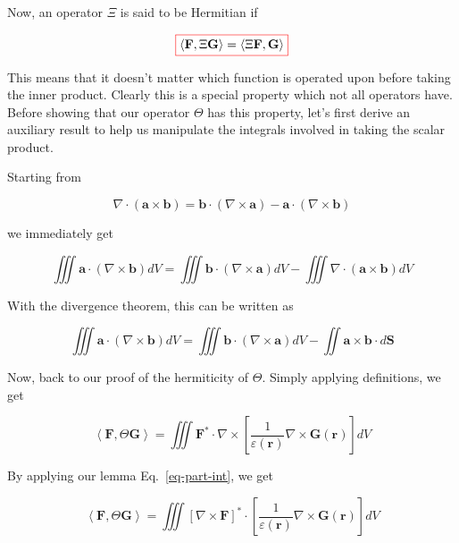Now, an operator $\Xi$ is said to be Hermitian if

\begin{equation}
\fbox{$\displaystyle
\left\langle {\mathbf F}, \Xi {\mathbf G}\right\rangle = \left\langle \Xi {\mathbf F}, {\mathbf G}\right\rangle
$}
\end{equation} 

This means that it doesn't matter which function is operated upon before taking the inner product. Clearly this is a special property which not all operators have. Before showing that our operator $\Theta$ has this property, let's first derive an auxiliary result to help us manipulate the integrals involved in taking the scalar product. 

Starting from

\begin{equation}
\nabla \cdot ({\mathbf a} \times {\mathbf b}) = {\mathbf b} \cdot ( \nabla \times {\mathbf a}) - {\mathbf a}  \cdot (\nabla \times {\mathbf b})
\end{equation} 

we immediately get

\begin{equation}
\iiint {\mathbf a}  \cdot (\nabla \times {\mathbf b}) dV = \iiint {\mathbf b} \cdot ( \nabla \times {\mathbf a}) dV - \iiint \nabla \cdot ({\mathbf a} \times {\mathbf b}) dV 
\end{equation} 

With the divergence theorem, this can be written as

\begin{equation}
\iiint {\mathbf a}  \cdot (\nabla \times {\mathbf b}) dV = \iiint {\mathbf b} \cdot ( \nabla \times {\mathbf a}) dV - \iint  {\mathbf a} \times {\mathbf b} \cdot d{\mathbf S} \label{eq-part-int}
\end{equation} 

Now, back to our proof of the hermiticity of $\Theta$. Simply applying definitions, we get

\begin{equation}
\left\langle {\mathbf F}, \Theta {\mathbf G}\right\rangle = \iiint {\mathbf F}^* \cdot\nabla \times \left[ \frac{1}{\varepsilon({\mathbf r})}\nabla \times {\mathbf G({\mathbf r})}  \right ] dV 
\end{equation} 

By applying our lemma Eq.~\ref{eq-part-int}, we get

\begin{equation}
\left\langle {\mathbf F}, \Theta {\mathbf G}\right\rangle = \iiint [ \nabla \times {\mathbf F}]^* \cdot \left[ \frac{1}{\varepsilon({\mathbf r})}\nabla \times {\mathbf G({\mathbf r})}  \right ] dV 
\label{eq-pos-omega}
\end{equation} 

